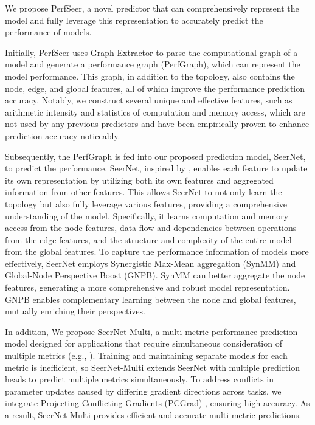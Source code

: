 We propose PerfSeer, a novel predictor that can comprehensively represent the model and fully leverage this representation to accurately predict the performance of models.

Initially, 
PerfSeer uses Graph Extractor to parse the computational graph of a model and generate a performance graph (PerfGraph), which can represent the model performance.
This graph, in addition to the topology, also contains the node, edge, and global features, all of which improve the performance prediction accuracy.
Notably, we construct several unique and effective features, such as arithmetic intensity and statistics of computation and memory access, which are not used by any previous predictors and have been empirically proven to enhance prediction accuracy noticeably.

Subsequently, 
the PerfGraph is fed into our proposed prediction model, SeerNet, to predict the performance.
SeerNet, inspired by \cite{gn}, enables each feature to update its own representation by utilizing both its own features and aggregated information from other features.  
This allows SeerNet to not only learn the topology but also fully leverage various features, providing a comprehensive understanding of the model. 
Specifically, it learns computation and memory access from the node features, data flow and dependencies between operations from the edge features, and the structure and complexity of the entire model from the global features.
To capture the performance information of models more effectively, SeerNet employs Synergistic Max-Mean aggregation (SynMM) and Global-Node Perspective Boost (GNPB).
SynMM can better aggregate the node features, generating a more comprehensive and robust model representation.
GNPB enables complementary learning between the node and global features, mutually enriching their perspectives.

In addition, 
We propose SeerNet-Multi, a multi-metric performance prediction model designed for applications that require simultaneous consideration of multiple metrics (e.g., \cite{Horus,Liquid}). Training and maintaining separate models for each metric is inefficient, so SeerNet-Multi extends SeerNet with multiple prediction heads to predict multiple metrics simultaneously. To address conflicts in parameter updates caused by differing gradient directions across tasks, we integrate Projecting Conflicting Gradients (PCGrad) \cite{pcgrad}, ensuring high accuracy. 
As a result, SeerNet-Multi provides efficient and accurate multi-metric predictions.

